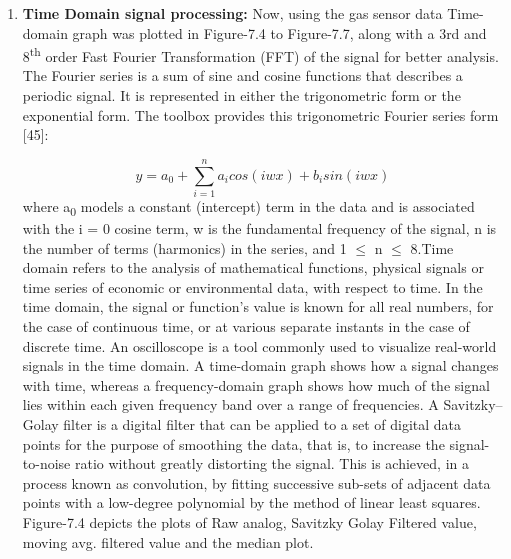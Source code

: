 \begin{enumerate}[label=\roman*]

\par

\par

\item \textbf{Time Domain signal processing:} Now, using the gas sensor data Time-domain graph was plotted in Figure-7.4 to Figure-7.7,
along with a 3rd and 8\textsuperscript{th} order Fast Fourier Transformation (FFT) of the signal for better analysis. The Fourier series is a sum of sine and cosine functions that describes a periodic signal. It is represented in either the trigonometric form or the exponential form. The toolbox provides this trigonometric Fourier series form [45]:\par


\begin{equation}\tag{7.5}
y=a_{0}+ \sum _{i=1}^{n}a_{i}cos ( iwx ) +b_{i}sin ( iwx )
\end{equation}
\setlength{\parskip}{8.04pt}
where a\textsubscript{0} models a constant (intercept) term in the data and is associated with the i = 0 cosine term, w is the fundamental frequency of the signal, n is the number of terms (harmonics) in the series, and 1 $ \leq $  n $ \leq $  8.Time domain refers to the analysis of mathematical functions, physical signals or time series of economic or environmental data, with respect to time. In the time domain, the signal or function's value is known for all real numbers, for the case of continuous time, or at various separate instants in the case of discrete time. An oscilloscope is a tool commonly used to visualize real-world signals in the time domain. A time-domain graph shows how a signal changes with time, whereas a frequency-domain graph shows how much of the signal lies within each given frequency band over a range of frequencies. A Savitzky–Golay filter is a digital filter that can be applied to a set of digital data points for the purpose of smoothing the data, that is, to increase the signal-to-noise ratio without greatly distorting the signal. This is achieved, in a process known as convolution, by fitting successive sub-sets of adjacent data points with a low-degree polynomial by the method of linear least squares. Figure-7.4 depicts the plots of Raw analog, Savitzky Golay Filtered value, moving avg. filtered value and the median plot.\par




\end{enumerate}
